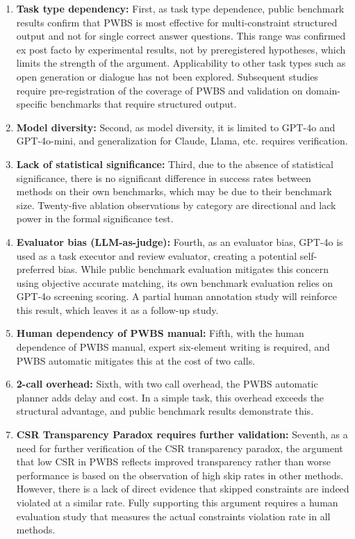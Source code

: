 \documentclass[11pt,a4paper]{article}
\begin{document}
\begin{enumerate}[leftmargin=2em]
  \item \textbf{Task type dependency:} First, as task type dependence, public benchmark results confirm that PWBS is most effective for multi-constraint structured output and not for single correct answer questions. This range was confirmed ex post facto by experimental results, not by preregistered hypotheses, which limits the strength of the argument. Applicability to other task types such as open generation or dialogue has not been explored. Subsequent studies require pre-registration of the coverage of PWBS and validation on domain-specific benchmarks that require structured output.

  \item \textbf{Model diversity:} Second, as model diversity, it is limited to GPT-4o and GPT-4o-mini, and generalization for Claude, Llama, etc. requires verification.

  \item \textbf{Lack of statistical significance:} Third, due to the absence of statistical significance, there is no significant difference in success rates between methods on their own benchmarks, which may be due to their benchmark size. Twenty-five ablation observations by category are directional and lack power in the formal significance test.

  \item \textbf{Evaluator bias (LLM-as-judge):} Fourth, as an evaluator bias, GPT-4o is used as a task executor and review evaluator, creating a potential self-preferred bias. While public benchmark evaluation mitigates this concern using objective accurate matching, its own benchmark evaluation relies on GPT-4o screening scoring. A partial human annotation study will reinforce this result, which leaves it as a follow-up study.

  \item \textbf{Human dependency of PWBS manual:} Fifth, with the human dependence of PWBS manual, expert six-element writing is required, and PWBS automatic mitigates this at the cost of two calls.

  \item \textbf{2-call overhead:} Sixth, with two call overhead, the PWBS automatic planner adds delay and cost. In a simple task, this overhead exceeds the structural advantage, and public benchmark results demonstrate this.

  \item \textbf{CSR Transparency Paradox requires further validation:} Seventh, as a need for further verification of the CSR transparency paradox, the argument that low CSR in PWBS reflects improved transparency rather than worse performance is based on the observation of high skip rates in other methods. However, there is a lack of direct evidence that skipped constraints are indeed violated at a similar rate. Fully supporting this argument requires a human evaluation study that measures the actual constraints violation rate in all methods.
\end{enumerate}
\end{document}
